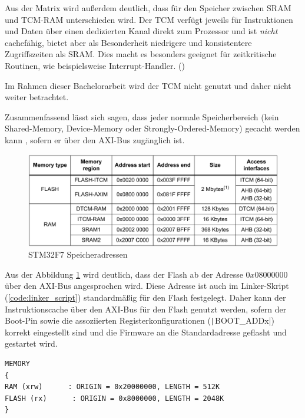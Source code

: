 Aus der Matrix wird außerdem deutlich, dass für den Speicher zwischen SRAM und
\ac{TCM}-RAM unterschieden wird. Der TCM verfügt jeweils für Instruktionen und
Daten über einen dedizierten Kanal direkt zum Prozessor und ist \textit{nicht}
cachefähig, bietet aber als Besonderheit niedrigere und konsistentere
Zugriffszeiten als SRAM. Dies macht es besonders geeignet für zeitkritische
Routinen, wie beispielsweise Interrupt-Handler. (\cite{arm_den0042})

Im Rahmen dieser Bachelorarbeit wird der TCM nicht genutzt und daher nicht
weiter betrachtet.

Zusammenfassend lässt sich sagen, dass jeder normale Speicherbereich (kein
Shared-Memory, Device-Memory oder Strongly-Ordered-Memory) gecacht werden kann
\cite[S. 7]{an4667}, sofern er über den AXI-Bus zugänglich ist.

\begin{figure}[htb]
    \centering
    \includegraphics[width=1\textwidth]{assets/internal_mem_table}
    \caption{STM32F7 Speicheradressen \cite[S. 14]{an4667}}
    \label{fig:internal_mem_table}
\end{figure}

Aus der Abbildung \ref{fig:internal_mem_table} wird deutlich, dass der Flash ab
der Adresse $0x0800 0000$ über den AXI-Bus angesprochen wird. Diese Adresse ist
auch im Linker-Skript (\ref{code:linker_script}) standardmäßig für den Flash
festgelegt. Daher kann der Instruktionscache über den AXI-Bus für den Flash
genutzt werden, sofern der Boot-Pin sowie die assoziierten
Registerkonfigurationen (\texttt|BOOT_ADDx|) korrekt eingestellt sind
\cite[S. 28]{stm32_datasheet} und die Firmware an die Standardadresse geflasht
und gestartet wird.

\begin{code}
\begin{verbatim}
MEMORY
{
RAM (xrw)      : ORIGIN = 0x20000000, LENGTH = 512K
FLASH (rx)      : ORIGIN = 0x8000000, LENGTH = 2048K
}
\end{verbatim}
    \label{code:linker_script}
\end{code}

